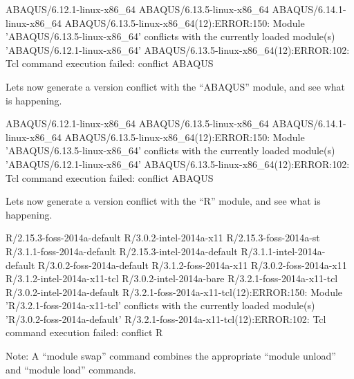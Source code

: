 \begin{prompt}
ABAQUS/6.12.1-linux-x86_64
ABAQUS/6.13.5-linux-x86_64
ABAQUS/6.14.1-linux-x86_64
ABAQUS/6.13.5-linux-x86_64(12):ERROR:150: Module 'ABAQUS/6.13.5-linux-x86_64' conflicts with the currently loaded module(s) 'ABAQUS/6.12.1-linux-x86_64'
ABAQUS/6.13.5-linux-x86_64(12):ERROR:102: Tcl command execution failed: conflict ABAQUS
\end{prompt}
\fi
\ifbrussel
Lets now generate a version conflict with the ``ABAQUS'' module, and see what
is happening.

\begin{prompt}
ABAQUS/6.12.1-linux-x86_64
ABAQUS/6.13.5-linux-x86_64
ABAQUS/6.14.1-linux-x86_64
ABAQUS/6.13.5-linux-x86_64(12):ERROR:150: Module 'ABAQUS/6.13.5-linux-x86_64' conflicts with the currently loaded module(s) 'ABAQUS/6.12.1-linux-x86_64'
ABAQUS/6.13.5-linux-x86_64(12):ERROR:102: Tcl command execution failed: conflict ABAQUS
\end{prompt}
\fi
\ifleuven
\begin{prompt}
Lets now generate a version conflict with the ``R'' module, and see what
is happening.

R/2.15.3-foss-2014a-default  R/3.0.2-intel-2014a-x11
R/2.15.3-foss-2014a-st       R/3.1.1-foss-2014a-default
R/2.15.3-intel-2014a-default R/3.1.1-intel-2014a-default
R/3.0.2-foss-2014a-default   R/3.1.2-foss-2014a-x11
R/3.0.2-foss-2014a-x11       R/3.1.2-intel-2014a-x11-tcl
R/3.0.2-intel-2014a-bare     R/3.2.1-foss-2014a-x11-tcl
R/3.0.2-intel-2014a-default
R/3.2.1-foss-2014a-x11-tcl(12):ERROR:150: Module 'R/3.2.1-foss-2014a-x11-tcl' conflicts with the currently loaded module(s) 'R/3.0.2-foss-2014a-default'
R/3.2.1-foss-2014a-x11-tcl(12):ERROR:102: Tcl command execution failed: conflict    R
\end{prompt}
\fi

Note: A ``module swap'' command combines the appropriate ``module unload''
and ``module load'' commands.

